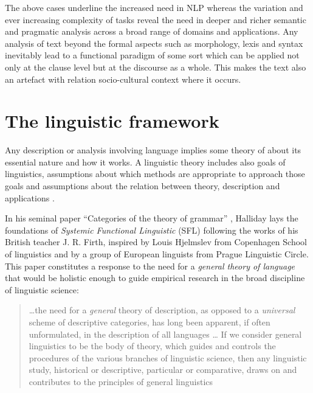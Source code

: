 The above cases underline the increased need in NLP whereas the variation and ever increasing complexity of tasks reveal the need in deeper and richer semantic and pragmatic analysis across a broad range of domains and applications. Any analysis of text beyond the formal aspects such as morphology, lexis and syntax inevitably lead to a functional paradigm of some sort which can be applied not only at the clause level but at the discourse as a whole. This makes the text also an artefact with relation socio-cultural context where it occurs. 

\section{The linguistic framework}
\label{sec:framework}
Any description or analysis involving language implies some theory of about its essential nature and how it works. A linguistic theory includes also goals of linguistics, assumptions about which methods are appropriate to approach those goals and assumptions about the relation between theory, description and applications \citep[3]{Fawcett2000}. 

In his seminal paper ``Categories of the theory of grammar'' \citep{Halliday61-orig}, Halliday lays the foundations of \textit{Systemic Functional Linguistic} (SFL) following the works of his British teacher J. R. Firth, inspired by Louis Hjelmslev \citep{Hjelmslev53} from Copenhagen School of linguistics and by a group of European linguists from Prague Linguistic Circle. This paper constitutes a response to the need for a \textit{general theory of language} that would be holistic enough to guide empirical research in the broad discipline of linguistic science:
\begin{quotation}
    \dots the need for a \textit{general} theory of description, as opposed to a \textit{universal} scheme of descriptive categories, has long been apparent, if often unformulated, in the description of all languages \citep[54; emphasis in original]{Halliday57}
    \dots
    If we consider general linguistics to be the body of theory, which guides and controls the procedures of the various branches of linguistic science, then any linguistic study, historical or descriptive, particular or comparative, draws on and contributes to the principles of general linguistics \citep[55]{Halliday57}
\end{quotation} 



